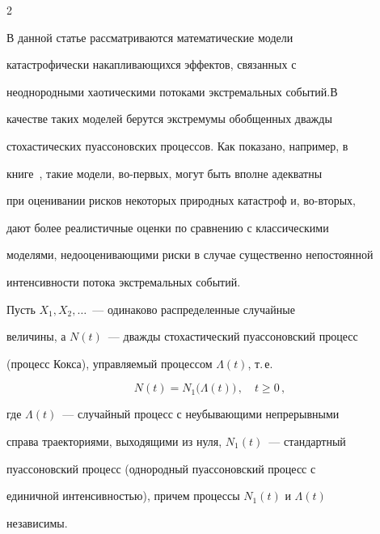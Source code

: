       \begin{multicols}{2}





      \label{st\stat}


   





В данной статье рассматриваются математические модели


катастрофически на\-кап\-ли\-ва\-ющих\-ся эффектов, связанных с


неоднородными хаотическими потоками экстремальных событий.\linebreak В


качестве таких моделей берутся экстремумы обобщенных дважды


стохастических пуассоновских процессов. Как показано, например, в


книге~\cite{1a}, такие модели, во-первых, могут быть вполне адекватны


при оценивании рисков некоторых природных катастроф и, во-вторых,


дают более реалистичные оценки по сравнению с классическими


моделями, недооценивающими риски в случае существенно непостоянной


интенсивности потока экстремальных событий.





Пусть $X_1,X_2,\ldots$~--- одинаково распределенные случайные


величины, а $N(t)$~--- дважды стохастический пуассоновский процесс


(процесс Кокса), управляемый процессом $\Lambda(t)$, т.\,е.\


$$


N(t)=N_1\big(\Lambda(t)\big)\,,\quad t\ge 0\,,


$$


где $\Lambda(t)$~--- случайный процесс с неубывающими непрерывными


справа траекториями, выходящими из нуля, $N_1(t)$~--- стандартный


пуассоновский процесс (однородный пуассоновский процесс с


единичной интенсивностью), причем процессы $N_1(t)$ и $\Lambda(t)$


независимы.






\end{multicols}
